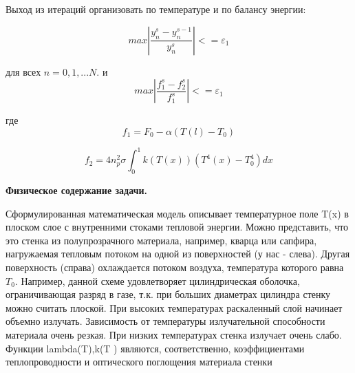 \documentclass[a4paper,oneside,12pt]{extreport}
\begin{document}
Выход из итераций организовать по температуре и по балансу энергии:

\begin{equation*}
	max|\frac{y^s_n - y^{s-1}_n}{y^s_n}| <= \varepsilon_{1}
\end{equation*} 

\indent для всех $n = 0, 1, ... N.$ и \\

\begin{equation*}
	max|\frac{f^s_1 - f^s_2}{f^s_1}| <= \varepsilon_{1}
\end{equation*}

где \\

\begin{equation*}
	f_{1} = F_0 - \alpha(T(l) - T_{0})
\end{equation*}

\begin{equation*}
	f_{2}  = 4n^2_p \sigma \int^1_0 k(T(x))(T^4(x) - T^4_0) dx
\end{equation*}

\textbf{Физическое содержание задачи.} 

Сформулированная математическая модель описывает температурное поле T(x)
в плоском слое с внутренними стоками тепловой энергии. Можно представить, что это
стенка из полупрозрачного материала, например, кварца или сапфира, 
нагружаемая тепловым потоком на одной из поверхностей (у нас - слева). Другая поверхность (справа)
охлаждается потоком воздуха, температура которого равна $T_0$. Например, данной схеме
удовлетворяет цилиндрическая оболочка, ограничивающая разряд в газе, т.к. при больших
диаметрах цилиндра стенку можно считать плоской. При высоких температурах раскаленный слой начинает объемно излучать.
Зависимость от температуры излучательной способности материала очень резкая. При низких температурах стенка излучает очень слабо.
Функции lambda(T),k(T ) являются, соответственно, коэффициентами теплопроводности и оптического поглощения материала стенки

\newpage 
\end{document}

